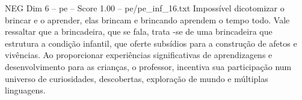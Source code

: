 \begin{textsample}{NEG Dim 6 – pe – Score 1.00 – pe/pe\_inf\_16.txt}
Impossível dicotomizar o brincar e o aprender, elas brincam e brincando aprendem o tempo todo.
Vale ressaltar que a brincadeira, que se fala, trata -se de uma brincadeira que estrutura a condição infantil, que oferte subsídios para a construção de afetos e vivências.
Ao proporcionar experiências significativas de aprendizagens e desenvolvimento para as crianças, o professor, incentiva sua participação num universo de curiosidades, descobertas, exploração de mundo e múltiplas linguagens.

\end{textsample}
